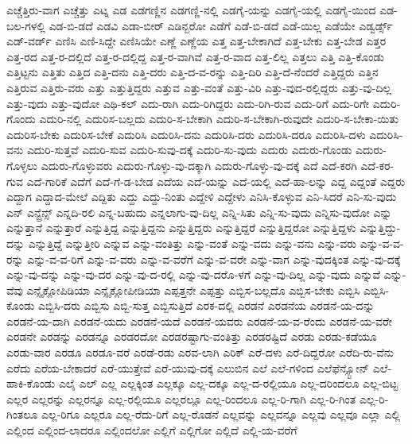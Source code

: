 {ಎಚ್ಚೆತ್ತಿರು-ವಾಗ
ಎಚ್ಚೆತ್ತು
ಎಟ್ನ
ಎಡ
ಎಡಗಣ್ಣಿನ
ಎಡಗಣ್ಣಿ-ನಲ್ಲಿ
ಎಡಗೈ-ಯನ್ನು
ಎಡಗೈ-ಯಲ್ಲಿ
ಎಡಗೈ-ಯಿಂದ
ಎಡ-ಬಲ-ಗಳಲ್ಲಿ
ಎಡ-ಬಿ-ಡದೆ
ಎಡವಿ
ಎಡಾ-ಬೀರ್
ಎಡಿನ್ಬರೋ
ಎಡೆಗೆ
ಎಡೆ-ಬಿ-ಡದೆ
ಎಡೆ-ಯಿಲ್ಲ
ಎಡೆಯೇ
ಎಡ್ವರ್ಡ್ಸ್
ಎಡ್-ವರ್ಡ್
ಎಣಿಸಿ
ಎಣಿ-ಸಿದ್ದೇ
ಎಣಿಸಿಯೇ
ಎಣ್ಣೆ
ಎಣ್ಣೆಯ
ಎತ್ತ
ಎತ್ತ-ಬೇಕಾಗಿದೆ
ಎತ್ತ-ಬೇಕು
ಎತ್ತ-ಬೇಡ
ಎತ್ತರ
ಎತ್ತ-ರದ
ಎತ್ತ-ರ-ದಲ್ಲಿದೆ
ಎತ್ತ-ರ-ದಲ್ಲಿದ್ದ
ಎತ್ತ-ರ-ವಾಗಿವೆ
ಎತ್ತ-ರ-ವಾದ
ಎತ್ತ-ಲಿಲ್ಲ
ಎತ್ತಲು
ಎತ್ತಿ
ಎತ್ತಿ-ಕೊಂಡು
ಎತ್ತಿಟ್ಟನು
ಎತ್ತಿತು
ಎತ್ತಿದ
ಎತ್ತಿ-ದನು
ಎತ್ತಿ-ದರು
ಎತ್ತಿ-ದ-ವ-ರನ್ನು
ಎತ್ತಿ-ದಿರಿ
ಎತ್ತಿ-ದೆ-ನೆಂದರೆ
ಎತ್ತಿದ್ದರು
ಎತ್ತಿನ
ಎತ್ತಿರುವ
ಎತ್ತಿರು-ವರು
ಎತ್ತು
ಎತ್ತುತ್ತಿದ್ದರು
ಎತ್ತುವ
ಎತ್ತು-ವಂತೆ
ಎತ್ತು-ವಿರಿ
ಎತ್ತು-ವುದ-ರಲ್ಲಿದ್ದರು
ಎತ್ತು-ವು-ದಿಲ್ಲ
ಎತ್ತು-ವುದು
ಎತ್ತು-ವುದೋ
ಎಥಿ-ಕಲ್
ಎದು-ರಾಗಿ
ಎದು-ರಿಗಿದ್ದರು
ಎದು-ರಿಗಿ-ರುವ
ಎದು-ರಿಗೆ
ಎದು-ರಿಗೇ
ಎದುರಿ-ಗೊಂದು
ಎದುರಿ-ನಲ್ಲಿ
ಎದುರಿಸ-ಬಲ್ಲದು
ಎದುರಿ-ಸ-ಬೇಕಾಗಿ
ಎದುರಿ-ಸ-ಬೇಕಾಗಿ-ರುವುದೇ
ಎದುರಿ-ಸ-ಬೇಕಾ-ಯಿತು
ಎದುರಿಸ-ಬೇಕು
ಎದುರಿಸ-ಬೇಕೆ
ಎದುರಿಸಿ
ಎದುರಿಸಿ-ದನು
ಎದುರಿಸಿ-ದರು
ಎದುರಿಸಿ-ದರೂ
ಎದುರಿಸಿ-ದಳು
ಎದುರಿಸಿ-ವನು
ಎದುರಿ-ಸುತ್ತವೆ
ಎದುರಿ-ಸುವ
ಎದುರಿ-ಸುವು-ದಕ್ಕೆ
ಎದುರಿ-ಸು-ವುದು
ಎದುರು
ಎದುರು-ಗೊಂಡು
ಎದುರು-ಗೊಳ್ಳಲು
ಎದುರು-ಗೊಳ್ಳುವರು
ಎದುರು-ಗೊಳ್ಳು-ವು-ದಕ್ಕಾಗಿ
ಎದುರು-ಗೊಳ್ಳು-ವು-ದಕ್ಕೆ
ಎದೆ
ಎದೆ-ಕರಗಿ
ಎದೆ-ಕರ-ಗುವ
ಎದೆ-ಗಾರಿಕೆ
ಎದೆಗೆ
ಎದೆ-ಗೆ-ಡ-ಬೇಡ
ಎದೆಯ
ಎದೆ-ಯನ್ನು
ಎದೆ-ಯಲ್ಲಿ
ಎದೆ-ಹಾ-ಲನ್ನು
ಎದ್ದ
ಎದ್ದಂತೆ
ಎದ್ದರು
ಎದ್ದಾಗ
ಎದ್ದಾದ-ಮೇಲೆ
ಎದ್ದಿತು
ಎದ್ದು
ಎದ್ದು-ನಿಂತು
ಎದ್ದೇಳಿ
ಎದ್ದೇಳು
ಎನಿಸಿ-ಕೊಳ್ಳುವ
ಎನಿ-ಸಿದರೆ
ಎನಿ-ಸು-ವುದು
ಎನ್
ಎನ್ಟ್ರೆನ್ಸ್
ಎನ್ನದಿ-ರಲಿ
ಎನ್ನ-ಬಹುದು
ಎನ್ನಲಾಗು-ವು-ದಿಲ್ಲ
ಎನ್ನಿ-ಸಿತು
ಎನ್ನಿ-ಸು-ವುದು
ಎನ್ನಿಸು-ವುದೋ
ಎನ್ನು
ಎನ್ನುತ್ತಾನೆ
ಎನ್ನುತ್ತಾರೆ
ಎನ್ನುತ್ತಿದ್ದ
ಎನ್ನುತ್ತಿದ್ದನು
ಎನ್ನುತ್ತಿದ್ದರು
ಎನ್ನುತ್ತಿದ್ದರೆ
ಎನ್ನುತ್ತಿದ್ದರೋ
ಎನ್ನುತ್ತಿದ್ದಳು
ಎನ್ನುತ್ತಿದ್ದು-ದನ್ನು
ಎನ್ನುತ್ತಿದ್ದೆ
ಎನ್ನುತ್ತೀರಿ
ಎನ್ನುವ
ಎನ್ನು-ವಂತಿತ್ತು
ಎನ್ನು-ವಂತೆ
ಎನ್ನು-ವದು
ಎನ್ನು-ವನು
ಎನ್ನು-ವರು
ಎನ್ನು-ವ-ವ-ರನ್ನು
ಎನ್ನು-ವ-ವ-ರಿಗೆ
ಎನ್ನು-ವ-ವರು
ಎನ್ನು-ವ-ವರೆಗೆ
ಎನ್ನು-ವ-ವರೇ
ಎನ್ನು-ವಾಗ
ಎನ್ನು-ವುದಕ್ಕಿಂತ
ಎನ್ನು-ವು-ದಕ್ಕೆ
ಎನ್ನು-ವು-ದನ್ನು
ಎನ್ನು-ವು-ದರ
ಎನ್ನು-ವು-ದ-ರಲ್ಲಿ
ಎನ್ನು-ವು-ದರೊ-ಳಗೆ
ಎನ್ನು-ವು-ದಿಲ್ಲ
ಎನ್ನು-ವುದು
ಎನ್ನುವೆ
ಎನ್ನು-ವೆವು
ಎನ್ಸೈಕ್ಲೋಪಿಡಿಯಾ
ಎನ್ಸೈಕ್ಲೋಪೀಡಿಯಾ
ಎಪ್ಪತ್ತನೇ
ಎಪ್ಪತ್ತು
ಎಬ್ಬಿಸ-ಬಲ್ಲದೊ
ಎಬ್ಬಿಸ-ಬೇಕು
ಎಬ್ಬಿಸಿ
ಎಬ್ಬಿಸಿ-ಕೊಂಡು
ಎಬ್ಬಿಸಿ-ದರು
ಎಬ್ಬಿಸು
ಎಬ್ಬಿ-ಸುತ್ತ
ಎಬ್ಬಿಸುತ್ತಿದೆ
ಎರಕ-ದಲ್ಲಿ
ಎರಡನೆ
ಎರಡನೆಯ
ಎರಡನೆ-ಯ-ದನ್ನು
ಎರಡನೆ-ಯ-ದಾಗಿ
ಎರಡನೆ-ಯದು
ಎರಡನೆ-ಯದೆ
ಎರಡನೆ-ಯವರು
ಎರಡನೆ-ಯ-ವ-ರೆಂದು
ಎರಡನೆ-ಯ-ವರೇ
ಎರಡನೇ
ಎರಡನ್ನು
ಎರಡನ್ನೂ
ಎರಡರದೋ
ಎರಡರಷ್ಟಾಗು-ವಂತಿತ್ತು
ಎರಡರಷ್ಟಿದೆ
ಎರಡು
ಎರಡು-ಕಡೆಯೂ
ಎರಡು-ವಾರ
ಎರಡೂ
ಎರಡೂ-ವರೆ
ಎರಡೆ-ರಡು
ಎರವ-ಲಾಗಿ
ಎರಿಕ್
ಎರೆ-ದಳು
ಎರೆ-ದಿದ್ದರೋ
ಎರೆದಿ-ರು-ವೆನು
ಎರೆದು
ಎರೆಯ-ಬೇಕಾದರೆ
ಎರೆ-ಯುತ್ತೇವೆ
ಎರೆ-ಯುವು-ದಕ್ಕೆ
ಎಲುಬಿನ
ಎಲೆ
ಎಲೆ-ಗಳಿಂದ
ಎಲೆಫೆನ್ಸ್ಟೋನ್
ಎಲೆ-ಹಾಕಿ-ಕೊಂಡು
ಎಲೈ
ಎಲ್
ಎಲ್ಲ
ಎಲ್ಲಕ್ಕಿಂತ
ಎಲ್ಲಕ್ಕೂ
ಎಲ್ಲ-ದಕ್ಕೂ
ಎಲ್ಲ-ದ-ರಲ್ಲಿಯೂ
ಎಲ್ಲ-ದರಿಂದಲೂ
ಎಲ್ಲ-ಬಿಟ್ಟ
ಎಲ್ಲರ
ಎಲ್ಲರನ್ನು
ಎಲ್ಲರನ್ನೂ
ಎಲ್ಲ-ರಲ್ಲಿಯೂ
ಎಲ್ಲರಲ್ಲೂ
ಎಲ್ಲ-ರಿಂದಲೂ
ಎಲ್ಲ-ರಿ-ಗಾಗಿ
ಎಲ್ಲ-ರಿ-ಗಿಂತ
ಎಲ್ಲ-ರಿ-ಗಿಂತಲೂ
ಎಲ್ಲ-ರಿಗೂ
ಎಲ್ಲರೂ
ಎಲ್ಲ-ರೆದು-ರಿಗೆ
ಎಲ್ಲ-ರೊಡನೆ
ಎಲ್ಲವನ್ನು
ಎಲ್ಲವನ್ನೂ
ಎಲ್ಲವು
ಎಲ್ಲವೂ
ಎಲ್ಲಾ
ಎಲ್ಲಿ
ಎಲ್ಲಿಂದ
ಎಲ್ಲಿಂದ-ಲಾದರೂ
ಎಲ್ಲಿಂದಲೋ
ಎಲ್ಲಿಗೆ
ಎಲ್ಲಿಗೋ
ಎಲ್ಲಿದೆ
ಎಲ್ಲಿ-ಯ-ವರೆಗೆ
}
